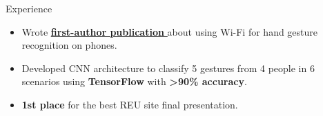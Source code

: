 \documentclass{resume} %
\begin{document}
\begin{workSection}{Experience}
    \experienceItem[
    company=Temple University,
    location=Philadelphia{,} PA,
    position=Undergraduate Research Intern,
    duration=June 2023 {-} July 2023
    ]
    \begin{itemize}
        \vspace{-0.5em}
        \itemsep -6pt {}
        \item Wrote
        \href{https://dl.acm.org/doi/10.1145/3565287.3617613}{\underline{\textbf{first-author publication} \faExternalLink}} 
				about using Wi-Fi 
				for hand gesture recognition on phones.
        \item Developed CNN architecture to classify 5 gestures from 4 people in 6 scenarios using \textbf{TensorFlow} with \textbf{>90\% accuracy}. %
        \item \textbf{1st place} for the best REU site final presentation. %
    \end{itemize}

\end{workSection}
\end{document}

